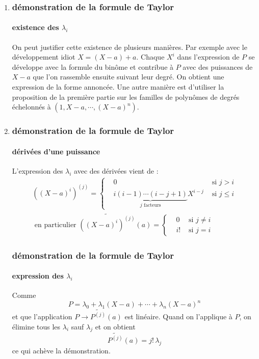 \begin{demo}
\begin{enumerate}
\item
\begin{frame}
\frametitle{démonstration de la formule de Taylor}
\framesubtitle{existence des $\lambda_i$} On peut justifier cette existence de plusieurs manières.\newline
Par exemple avec le  développement idiot $X=(X-a)+a$. Chaque $X^i$ dans l'expression de $P$ se développe avec la formule du binôme et contribue à $P$ avec des puissances de $X-a$ que l'on rassemble ensuite suivant leur degré. On obtient une expression de la forme annoncée.\newline
Une autre manière est d'utiliser la proposition de la première partie sur les familles de polynômes de degrés échelonnés à $\left( 1, X-a, \cdots, (X-a)^n\right) $.
\end{frame}
 \item \begin{frame}
\frametitle{démonstration de la formule de Taylor}
\framesubtitle{dérivées d'une puissance}
L'expression des $\lambda_i$ avec des dérivées vient de :
\begin{multline*}
 \left((X-a)^i \right)^{(j)}=
\left\lbrace  
\begin{aligned}
 &0 &\text{ si }j>i \\
 &\underset{j\text{ facteurs}}{\underbrace{i(i-1)\cdots (i-j+1)}}X^{i-j} &\text{ si }j\leq i
\end{aligned}
\right.\\
\text{ en particulier }
\widetilde{\left((X-a)^i \right)^{(j)}}(a)=
\left\lbrace  
\begin{aligned}
 &0 &\text{ si }j\neq i \\
 &i! &\text{ si }j= i
\end{aligned}
\right. 
\end{multline*}
\end{frame}
\begin{frame}
\frametitle{démonstration de la formule de Taylor}
\framesubtitle{expression des $\lambda_i$}
Comme
\begin{displaymath}
 P = \lambda_0+\lambda_1(X-a)+\cdots+\lambda_n(X-a)^n
\end{displaymath}
 et que l'application $P\rightarrow \widetilde{P^{(j)}}(a)$ est linéaire. Quand on l'applique à $P$, on élimine tous les $\lambda_i$ sauf $\lambda_j$ et on obtient
\begin{displaymath}
 \widetilde{P^{(j)}}(a) = j! \, \lambda_j
\end{displaymath}
 ce qui achève la démonstration.
\end{frame}
\end{enumerate}
\end{demo}

